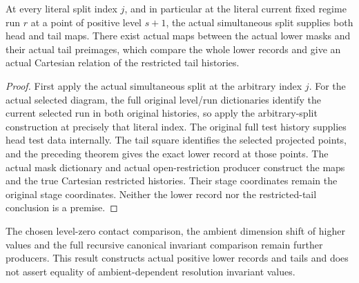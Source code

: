 \begin{theorem}
\label{hir:smooth-positive-lower-actual-selected-tail}
\leanok
{}
At every literal split index $j$, and in particular at the literal current
fixed regime run $r$ at a point of positive level $s+1$, the actual
simultaneous split supplies both head and tail maps.
There exist actual maps between the actual lower masks and their actual
tail preimages, which compare the whole lower records and give an actual
Cartesian relation of the restricted tail histories.
\end{theorem}
\begin{proof}
First apply the actual simultaneous split at the arbitrary index $j$.
For the actual selected diagram, the full original level/run dictionaries
identify the current selected run in both original histories, so apply
the arbitrary-split construction at precisely that literal index. The original full test history supplies head test
data internally. The tail square identifies the selected projected
points, and the preceding theorem gives the exact lower record at those
points. The actual mask dictionary and actual open-restriction producer
construct the maps and the true Cartesian restricted histories.
Their stage coordinates remain the original stage coordinates.
Neither the lower record nor the restricted-tail conclusion is a premise.
\end{proof}

The chosen level-zero contact comparison, the ambient dimension shift
of higher values and the full recursive canonical invariant comparison
remain further producers. This result constructs actual positive lower
records and tails and does not assert equality of ambient-dependent
resolution invariant values.
